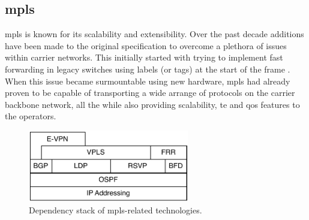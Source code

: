 
\subsection{\acs{mpls}} %
\label{sub:mpls}

\ac{mpls} is known for its scalability and extensibility. Over the past decade additions have been made to the original specification to overcome a plethora of issues within carrier networks. This initially started with trying to implement fast forwarding in legacy switches using labels (or tags) at the start of the frame \cite{tag-switching}. When this issue became surmountable using new hardware, \ac{mpls} had already proven to be capable of transporting a wide arrange of protocols on the carrier backbone network, all the while also providing scalability, \ac{te} and \ac{qos} features to the operators.



\begin{figure}[!h]
	\centering
	\includegraphics[width=7cm]{./includes/mpls-stack.pdf}
	\caption{Dependency stack of \ac{mpls}-related technologies.}
	\label{fig:mpls-stack}
\end{figure}




